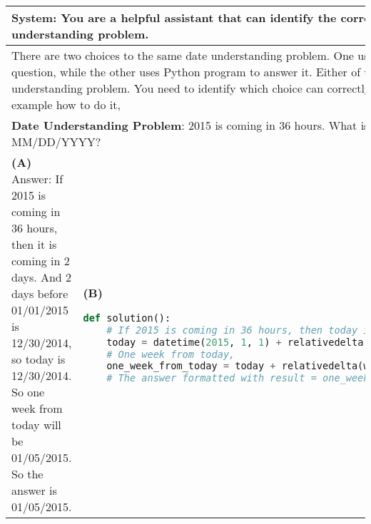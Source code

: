 \documentclass[11pt]{article}
\begin{document}
\begin{table*}[ht]
    \centering
    \begin{tabular}{p{}|p{}}
    \toprule
     \multicolumn{2}{p{0.92\textwidth}}{\small 
     \textbf{System}: You are a helpful assistant that can identify the correct answer to the date understanding problem.}\\
     \midrule
     \multicolumn{2}{p{0.92\textwidth}}{\small There are two choices to the same date understanding problem. One uses natural language to answer the question, while the other uses Python program to answer it. Either of them can correctly answer the date understanding problem. You need to identify which choice can correctly answer the problem. Here is one example how to do it,} \\
      \multicolumn{2}{p{0.92\textwidth}}{\small \textbf{Date Understanding Problem}: 2015 is coming in 36 hours. What is the date one week from today in MM/DD/YYYY? } \\
     
    \midrule

    \small \textbf{(A)} \newline
    \newline
    \small Answer: \newline
     \small If 2015 is coming in 36 hours, then it is coming in 2 days. \newline
     \small And 2 days before 01/01/2015 is 12/30/2014, so today is 12/30/2014. \newline
     \small So one week from today will be 01/05/2015. \newline
     \small So the answer is 01/05/2015.\newline
     &
    \small \textbf{(B)} 
    \lstset{style=mystyle}
     \begin{lstlisting}[language=Python]
def solution():
    # If 2015 is coming in 36 hours, then today is 36 hours before.
    today = datetime(2015, 1, 1) + relativedelta(hours=36)
    # One week from today,
    one_week_from_today = today + relativedelta(weeks=1)
    # The answer formatted with result = one_week_from_today.strftime('return result
     \end{lstlisting} \\


\end{tabular}
\end{table*}
\end{document}
